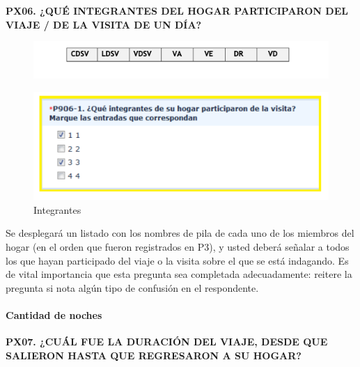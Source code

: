 \documentclass[
  openany]{book}
\begin{document}
\textbf{PX06. ¿QUÉ INTEGRANTES DEL HOGAR PARTICIPARON DEL VIAJE / DE LA VISITA DE UN DÍA?}

\begin{figure}

{\centering \includegraphics[width=1\linewidth]{imagenes/figura6-92} 

}

\end{figure}

\begin{figure}

{\centering \includegraphics[width=1\linewidth]{imagenes/figura6-93} 

}

\caption{Integrantes}\label{fig:integrant}
\end{figure}

Se desplegará un listado con los nombres de pila de cada uno de los miembros del hogar (en el orden que fueron registrados en P3), y usted deberá señalar a todos los que hayan participado del viaje o la visita sobre el que se está indagando. Es de vital importancia que esta pregunta sea completada adecuadamente: reitere la pregunta si nota algún tipo de confusión en el respondente.

\hypertarget{cantidad-de-noches}{%
\paragraph{Cantidad de noches}\label{cantidad-de-noches}}

\textbf{PX07. ¿CUÁL FUE LA DURACIÓN DEL VIAJE, DESDE QUE SALIERON HASTA QUE REGRESARON A SU HOGAR?}
\end{document}
